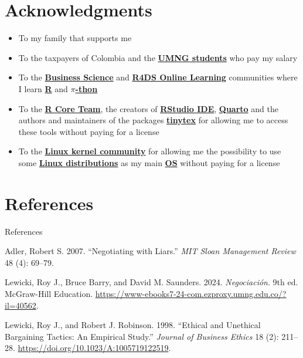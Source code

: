 \documentclass[
  ignorenonframetext,
]{beamer}
\newlength{\cslhangindent}
\newenvironment{CSLReferences}[2] %
 {\begin{list}{}{%
  \setlength{\itemindent}{0pt}
  \setlength{\leftmargin}{0pt}
  \setlength{\parsep}{0pt}
  \ifodd #1
   \setlength{\leftmargin}{\cslhangindent}
   \setlength{\itemindent}{-1\cslhangindent}
  \fi
  \setlength{\itemsep}{#2\baselineskip}}}
 {\end{list}}
\begin{document}
\section{Acknowledgments}\label{acknowledgments}

\begin{frame}{}
\label{section-15}
\begin{itemize}
\item
  To my family that supports me
\item
  To the taxpayers of Colombia and the
  \href{https://www.umng.edu.co/estudiante}{\textbf{UMNG students}} who
  pay my salary
\item
  To the \href{https://www.business-science.io/}{\textbf{Business
  Science}} and \href{https://www.rfordatasci.com/}{\textbf{R4DS Online
  Learning}} communities where I learn
  \href{https://www.r-project.org/about.html}{\textbf{R}} and
  \href{https://www.python.org/about/}{\textbf{\(\pi\)-thon}}
\item
  To the \href{https://www.r-project.org/contributors.html}{\textbf{R
  Core Team}}, the creators of
  \href{https://rstudio.com/products/rstudio/}{\textbf{RStudio IDE}},
  \href{https://quarto.org/}{\textbf{Quarto}} and the authors and
  maintainers of the packages
  \href{https://CRAN.R-project.org/package=tinytex}{\textbf{tinytex}}
  for allowing me to access these tools without paying for a license
\item
  To the \href{https://www.kernel.org/category/about.html}{\textbf{Linux
  kernel community}} for allowing me the possibility to use some
  \href{https://static.lwn.net/Distributions/}{\textbf{Linux
  distributions}} as my main
  \href{https://en.wikipedia.org/wiki/Operating_system}{\textbf{OS}}
  without paying for a license
\end{itemize}
\end{frame}

\section*{References}\label{references}

\begin{frame}[allowframebreaks]{References}
\label{refs}
\begin{CSLReferences}{1}{0}
Adler, Robert S. 2007. {``Negotiating with Liars.''} \emph{MIT Sloan
Management Review} 48 (4): 69--79.

Lewicki, Roy J., Bruce Barry, and David M. Saunders. 2024.
\emph{Negociación}. 9th ed. McGraw-Hill Education.
\url{https://www-ebooks7-24-com.ezproxy.umng.edu.co/?il=40562}.

Lewicki, Roy J., and Robert J. Robinson. 1998. {``Ethical and
{Unethical} {Bargaining} {Tactics}: {An} {Empirical} {Study}.''}
\emph{Journal of Business Ethics} 18 (2): 211--28.
\url{https://doi.org/10.1023/A:1005719122519}.

\end{CSLReferences}
\end{frame}
\end{document}
